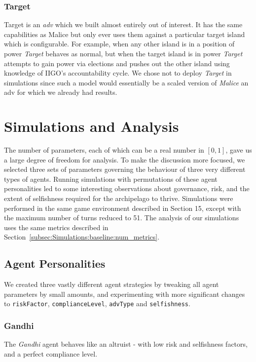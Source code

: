 \subsubsection{Target}
Target is an \emph{adv} which we built almost entirely out of interest. It has the same capabilities as Malice but only ever uses them against a particular target island which is configurable. For example, when any other island is in a position of power \emph{Target} behaves as normal, but when the target island is in power \emph{Target} attempts to gain power via elections and pushes out the other island using knowledge of IIGO's accountability cycle. We chose not to deploy \emph{Target} in simulations since such a model would essentially be a scaled version of \emph{Malice} an adv for which we already had results.

\section{Simulations and Analysis}
\label{sec:team3_simulation}

The number of parameters, each of which can be a real number in $[0,1]$, gave us a large degree of freedom for analysis. To make the discussion more focused, we selected three sets of parameters governing the behaviour of three very different types of agents. Running simulations with permutations of these agent personalities led to some interesting observations about governance, risk, and the extent of selfishness required for the archipelago to thrive. Simulations were performed in the same game environment described in Section 15, except with the maximum number of turns reduced to 51. The analysis of our simulations uses the same metrics described in Section~\ref{subsec:Simulations:baseline:num_metrics}.


\subsection{Agent Personalities} 
\label{section_agent_personalities}

We created three vastly different agent strategies by tweaking all agent parameters by small amounts, and experimenting with more significant changes to \texttt{riskFactor}, \texttt{complianceLevel}, \texttt{advType} and \texttt{selfishness}.

\subsubsection{Gandhi}
The \textit{Gandhi} agent behaves like an altruist - with low risk and selfishness factors, and a perfect compliance level.

